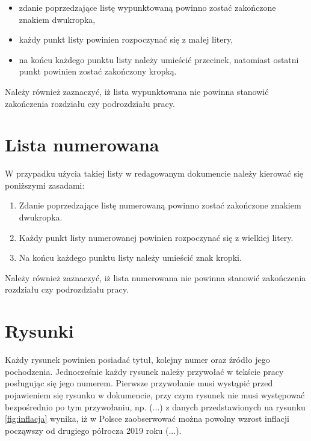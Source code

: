 \begin{itemize}
	\item zdanie poprzedzające listę wypunktowaną powinno zostać zakończone znakiem dwukropka,
	\item każdy punkt listy powinien rozpoczynać się z małej litery,
	\item na końcu każdego punktu listy należy umieścić przecinek, natomiast ostatni punkt powinien zostać zakończony kropką.
\end{itemize}

Należy również zaznaczyć, iż lista wypunktowana nie powinna stanowić zakończenia rozdziału czy podrozdziału pracy.



\section{Lista numerowana}

W przypadku użycia takiej listy w redagowanym dokumencie należy kierować się poniższymi zasadami:

\begin{enumerate}
	\item Zdanie poprzedzające listę numerowaną powinno zostać zakończone znakiem dwukropka.
	\item Każdy punkt listy numerowanej powinien rozpoczynać się z wielkiej litery.
	\item Na końcu każdego punktu listy należy umieścić znak kropki.
\end{enumerate}

Należy również zaznaczyć, iż lista numerowana nie powinna stanowić zakończenia rozdziału czy podrozdziału pracy.


\section{Rysunki}

Każdy rysunek powinien posiadać tytuł, kolejny numer oraz źródło jego pochodzenia. Jednocześnie każdy rysunek należy przywołać w tekście pracy posługując się jego numerem. Pierwsze przywołanie musi wystąpić przed pojawieniem się rysunku w dokumencie, przy czym rysunek nie musi występować bezpośrednio po tym przywołaniu, np. (...) z danych przedstawionych na rysunku \ref{fig:inflacja} wynika, iż w Polsce zaobserwować można powolny wzrost inflacji począwszy od drugiego półrocza 2019 roku (...).

